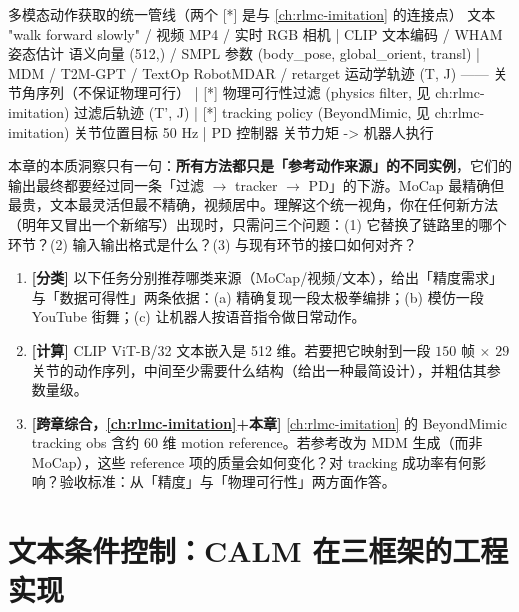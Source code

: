 \begin{codebox}{多模态动作获取的统一管线（两个 [*] 是与 \cref{ch:rlmc-imitation} 的连接点）}
文本 "walk forward slowly"  /  视频 MP4  /  实时 RGB 相机
    | CLIP 文本编码 / WHAM 姿态估计
语义向量 (512,)  /  SMPL 参数 (body_pose, global_orient, transl)
    | MDM / T2M-GPT / TextOp RobotMDAR / retarget
运动学轨迹 (T, J) —— 关节角序列（不保证物理可行）
    | [*] 物理可行性过滤 (physics filter, 见 ch:rlmc-imitation)
过滤后轨迹 (T', J)
    | [*] tracking policy (BeyondMimic, 见 ch:rlmc-imitation)
关节位置目标 50 Hz
    | PD 控制器
关节力矩 -> 机器人执行
\end{codebox}

\begin{insight}\label{ins:rlmc-mm-unified}
本章的本质洞察只有一句：\textbf{所有方法都只是「参考动作来源」的不同实例}，它们的输出最终都要经过同一条「过滤 $\to$ tracker $\to$ PD」的下游。MoCap 最精确但最贵，文本最灵活但最不精确，视频居中。理解这个统一视角，你在任何新方法（明年又冒出一个新缩写）出现时，只需问三个问题：(1) 它替换了链路里的哪个环节？(2) 输入输出格式是什么？(3) 与现有环节的接口如何对齐？
\end{insight}

\begin{practice}[练习·来源谱系]
\begin{enumerate}
  \item \textbf{[分类]} 以下任务分别推荐哪类来源（MoCap/视频/文本），给出「精度需求」与「数据可得性」两条依据：(a) 精确复现一段太极拳编排；(b) 模仿一段 YouTube 街舞；(c) 让机器人按语音指令做日常动作。
  \item \textbf{[计算]} CLIP ViT-B/32 文本嵌入是 512 维。若要把它映射到一段 $150$ 帧 $\times$ $29$ 关节的动作序列，中间至少需要什么结构（给出一种最简设计），并粗估其参数量级。
  \item \textbf{[跨章综合，\cref{ch:rlmc-imitation}+本章]} \cref{ch:rlmc-imitation} 的 BeyondMimic tracking obs 含约 60 维 motion reference。若参考改为 MDM 生成（而非 MoCap），这些 reference 项的质量会如何变化？对 tracking 成功率有何影响？验收标准：从「精度」与「物理可行性」两方面作答。
\end{enumerate}
\end{practice}

\section{文本条件控制：CALM 在三框架的工程实现}
\label{sec:rlmc-mm-calm}

